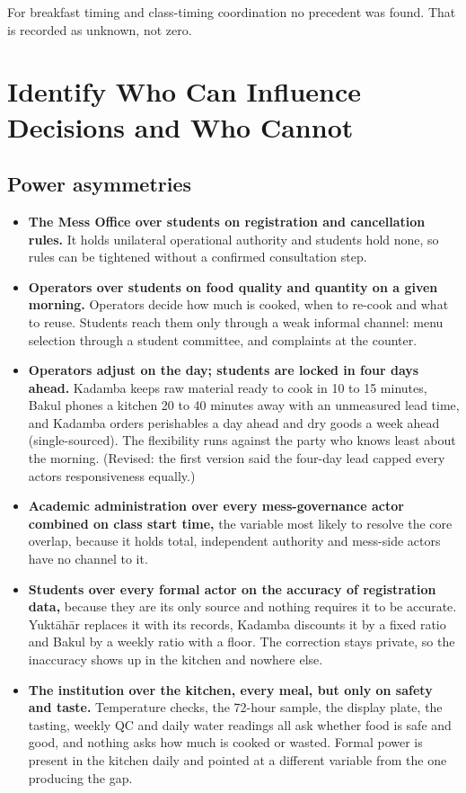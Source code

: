 \documentclass[
  10pt,
  table]{article}
\newcounter{none} %
\providecommand{\tightlist}{%
  \setlength{\itemsep}{0pt}\setlength{\parskip}{0pt}}
\renewcommand{\tightlist}{\setlength{\itemsep}{1.5pt}\setlength{\parskip}{0pt}}
\begin{document}
For breakfast timing and class-timing coordination no precedent was found. That is recorded as unknown, not zero.

\section{Identify Who Can Influence Decisions and Who Cannot}\label{identify-who-can-influence-decisions-and-who-cannot}

\subsection{Power asymmetries}\label{power-asymmetries}

\begin{itemize}
\tightlist
\item
  \textbf{The Mess Office over students on registration and cancellation rules.} It holds unilateral operational authority and students hold none, so rules can be tightened without a confirmed consultation step.
\item
  \textbf{Operators over students on food quality and quantity on a given morning.} Operators decide how much is cooked, when to re-cook and what to reuse. Students reach them only through a weak informal channel: menu selection through a student committee, and complaints at the counter.
\item
  \textbf{Operators adjust on the day; students are locked in four days ahead.} Kadamba keeps raw material ready to cook in 10 to 15 minutes, Bakul phones a kitchen 20 to 40 minutes away with an unmeasured lead time, and Kadamba orders perishables a day ahead and dry goods a week ahead (single-sourced). The flexibility runs against the party who knows least about the morning. (Revised: the first version said the four-day lead capped every actor\textquotesingle s responsiveness equally.)
\item
  \textbf{Academic administration over every mess-governance actor combined on class start time,} the variable most likely to resolve the core overlap, because it holds total, independent authority and mess-side actors have no channel to it.
\item
  \textbf{Students over every formal actor on the accuracy of registration data,} because they are its only source and nothing requires it to be accurate. Yuktāhār replaces it with its records, Kadamba discounts it by a fixed ratio and Bakul by a weekly ratio with a floor. The correction stays private, so the inaccuracy shows up in the kitchen and nowhere else.
\item
  \textbf{The institution over the kitchen, every meal, but only on safety and taste.} Temperature checks, the 72-hour sample, the display plate, the tasting, weekly QC and daily water readings all ask whether food is safe and good, and nothing asks how much is cooked or wasted. Formal power is present in the kitchen daily and pointed at a different variable from the one producing the gap.
\end{itemize}
\end{document}
